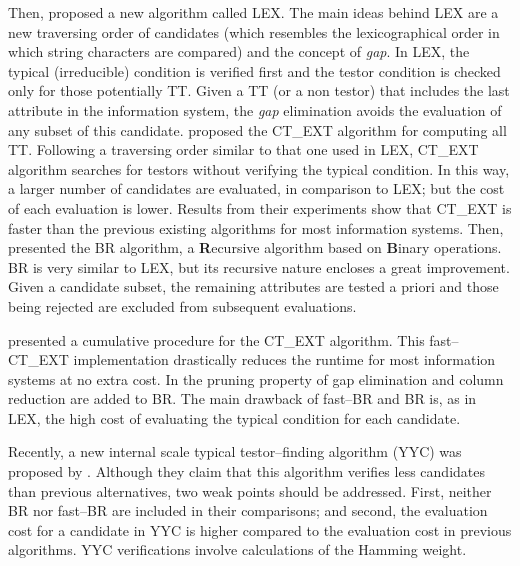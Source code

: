 \documentclass[authoryear,preprint,review,12pt]{elsarticle}
\begin{document}
  Then, \cite{Santiesteban03} proposed a new algorithm called LEX. The main ideas behind LEX are a new traversing
  order of candidates (which resembles the lexicographical order in which string characters are compared) and the
  concept of \emph{gap}. In LEX, the typical (irreducible) condition is verified first and the testor condition 
  is checked only for those potentially TT. Given a TT (or a non testor) that includes the last attribute in the
  information system, the \emph{gap} elimination avoids the evaluation of any subset of this candidate. \cite{Sanchez07}
  proposed the CT\_EXT algorithm for computing all TT. Following a traversing order similar to that one used in LEX, CT\_EXT
  algorithm searches for testors without verifying the typical condition. In this way, a larger number of 
  candidates are evaluated, in comparison to LEX; but the cost of each evaluation is lower. Results from their
  experiments show that CT\_EXT is faster than the previous existing algorithms for most information systems. Then,
  \cite{Lias09} presented the BR algorithm, a \textbf{R}ecursive algorithm based on \textbf{B}inary operations. 
  BR is very similar to LEX, but its recursive nature encloses a great improvement. Given a candidate subset, the 
  remaining attributes are tested a priori and those being rejected are excluded from subsequent evaluations. 
  
  \cite{Sanchez10} presented a cumulative procedure for the CT\_EXT algorithm. This fast--CT\_EXT implementation
  drastically reduces the runtime for most information systems at no extra cost. In \citep{Lias13} the pruning property of
  gap elimination and column reduction are added to BR. 
  The main drawback of fast--BR and BR is, as in LEX, the high cost of evaluating the typical condition for each candidate.
  
  Recently, a new internal scale typical testor--finding algorithm (YYC) was proposed by \cite{Alba14}. 
  Although they claim that this algorithm verifies less candidates than previous alternatives, two weak points
  should be addressed. First, neither BR nor fast--BR are included in their comparisons; and second, the evaluation cost for a candidate in YYC is higher compared to the evaluation cost in previous algorithms. YYC verifications involve calculations of the Hamming weight.
  
\end{document}
